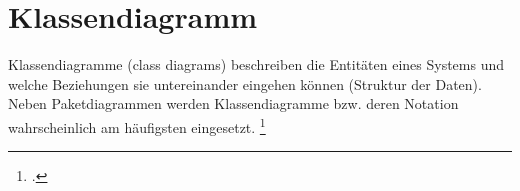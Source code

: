 \documentclass{lehramt-informatik}
\begin{document}

\chapter{Klassendiagramm}

\begin{quellen}
\item \cite[Seite 108-169]{rupp}
\item \cite[Zusammengefügtes PDF Seite 30-32 / Kapitel „Klassen“ 8-10]{brinda}
\item \cite{wiki:klassendiagramm}
\end{quellen}

Klassendiagramme (class diagrams) beschreiben die Entitäten eines
Systems und welche Beziehungen sie untereinander eingehen können
(Struktur der Daten). Neben Paketdiagrammen werden Klassendiagramme bzw.
deren Notation wahrscheinlich am häufigsten eingesetzt.
\footcite[Seite 166]{schatten}
\end{document}
